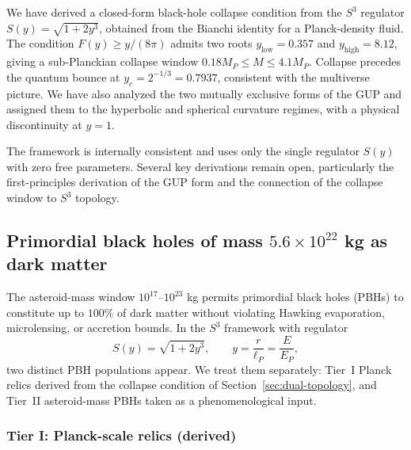 \documentclass[a4paper,1pt,oneside,openany]{book}
\begin{document}
We have derived a closed-form black-hole collapse condition 
from the $S^{3}$ regulator $S(y)=\sqrt{1+2y^{3}}$, obtained 
from the Bianchi identity for a Planck-density fluid. The 
condition $F(y)\geq y/(8\pi)$ admits two roots 
$y_{\text{low}}=0.357$ and $y_{\text{high}}=8.12$, giving a 
sub-Planckian collapse window $0.18 M_{P}\leq M\leq 4.1 M_{P}$. 
Collapse precedes the quantum bounce at 
$y_{c}=2^{-1/3}=0.7937$, consistent with the multiverse picture. 
We have also analyzed the two mutually exclusive forms of the 
GUP and assigned them to the hyperbolic and spherical curvature 
regimes, with a physical discontinuity at $y=1$.

The framework is internally consistent and uses only the single 
regulator $S(y)$ with zero free parameters. Several key 
derivations remain open, particularly the first-principles 
derivation of the GUP form and the connection of the collapse 
window to $S^{3}$ topology.

\subsection{Primordial black holes of mass $5.6\times10^{22}$ kg 
as dark matter}
\label{sec:PBH-asteroid}

The asteroid-mass window $10^{17}$--$10^{23}$ kg permits 
primordial black holes (PBHs) to constitute up to $100\%$ of 
dark matter without violating Hawking evaporation, microlensing, 
or accretion bounds. In the $S^{3}$ framework with regulator
\begin{equation}
S(y)=\sqrt{1+2y^{3}},\qquad y=\frac{r}{\ell_{P}}=\frac{E}{E_{P}},
\label{eq:S-PBH}
\end{equation}
two distinct PBH populations appear. We treat them separately: 
Tier~I Planck relics derived from the collapse condition of 
Section~\ref{sec:dual-topology}, and Tier~II asteroid-mass PBHs 
taken as a phenomenological input.

\subsubsection{Tier I: Planck-scale relics (derived)}
\end{document}
